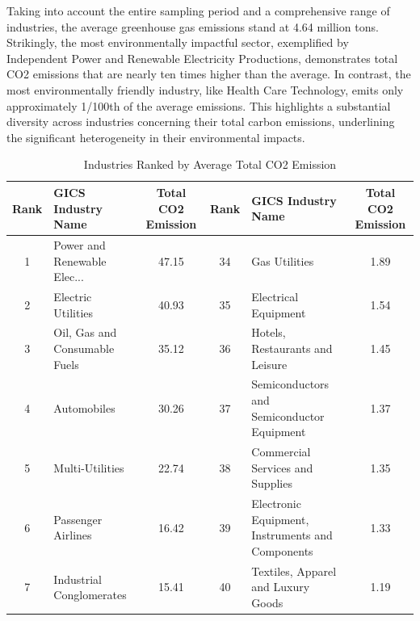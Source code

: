 \documentclass[12pt]{article}
\begin{document}
Taking into account the entire sampling period and a comprehensive range of industries, the average greenhouse gas emissions stand at 4.64 million tons. Strikingly, the most environmentally impactful sector, exemplified by Independent Power and Renewable Electricity Productions, demonstrates total CO2 emissions that are nearly ten times higher than the average. In contrast, the most environmentally friendly industry, like Health Care Technology, emits only approximately 1/100th of the average emissions. This highlights a substantial diversity across industries concerning their total carbon emissions, underlining the significant heterogeneity in their environmental impacts.

\begin{landscape}
\begin{table}[!ht]
\scriptsize
\centering
\caption{Industries Ranked by Average Total CO2 Emission}
\label{tab: industries rank}
\begin{tabular}{clcclc}
\toprule
 Rank &                                 GICS Industry Name &  Total CO2 Emission &  Rank &                               GICS Industry Name &  Total CO2 Emission \\
\midrule
   1 & Power and Renewable Elec... &               47.15 &    34 &                                    Gas Utilities &                1.89 \\
    2 &                                 Electric Utilities &               40.93 &    35 &                             Electrical Equipment &                1.54 \\
    3 &                      Oil, Gas and Consumable Fuels &               35.12 &    36 &                  Hotels, Restaurants and Leisure &                1.45 \\
    4 &                                        Automobiles &               30.26 &    37 &       Semiconductors and Semiconductor Equipment &                1.37 \\
    5 &                                    Multi-Utilities &               22.74 &    38 &                 Commercial Services and Supplies &                1.35 \\
    6 &                                 Passenger Airlines &               16.42 &    39 & Electronic Equipment, Instruments and Components &                1.33 \\
    7 &                           Industrial Conglomerates &               15.41 &    40 &               Textiles, Apparel and Luxury Goods &                1.19 \\

\end{tabular}
\end{table}
\end{landscape}
\end{document}
